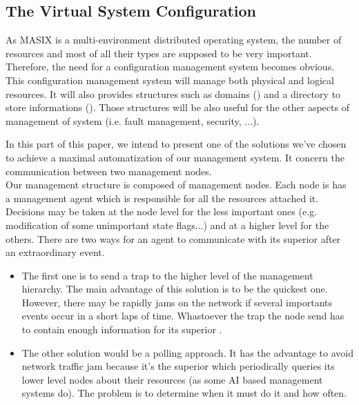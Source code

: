 %

\subsection{The Virtual System Configuration}
 
   As MASIX is a multi-environment distributed operating system, the number of resources and most of all their types are supposed to be very important. Therefore, the need for a configuration management system becomes obvious.
   This configuration management system will manage both physical and logical resources. It will also provides structures such as domains (\cite {langsford92}) and a directory to store informations (\cite {boutaba93}). Those structures will be also useful for the other aspects of management of system (i.e. fault management, security, ...).

   In this part of this paper, we intend to present one of the solutions we've chosen to achieve a maximal automatization of our management system. It concern the communication between two management nodes.\\

   Our management structure is composed of management nodes. Each node is has a management agent which is responsible for all the resources attached it. Decisions may be taken at the node level for the less important ones (e.g. modification of some unimportant state flags...) and at a higher level for the others. There are two ways for an agent to communicate with its superior after an extraordinary event.

\begin{itemize}

	\item The first one is to send a trap to the higher level of the management hierarchy. The main advantage of this solution is to be the quickest one. However, there may be rapidly jams on the network if several importants events occur in a short laps of time. Whastoever the trap the node send has to contain enough information for its superior \cite {rose91} .\\

	\item The other solution would be a polling approach. It has the advantage to avoid network traffic jam because it's the superior which periodically queries its lower level nodes about their resources (as some AI based management systems do). The problem is to determine when it must do it and how often.

\end{itemize}
 
